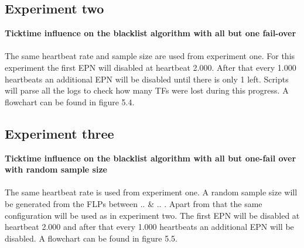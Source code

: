 
\subsection{Experiment two}
\textbf{Ticktime influence on the blacklist algorithm with all but one fail-over}
\\\\
The same heartbeat rate and sample size are used from experiment one. For this experiment the first EPN will disabled at heartbeat 2.000. After that every 1.000 heartbeats an additional EPN will be disabled until there is only 1 left. Scripts will parse all the logs to check how many TFs were lost during this progress. A flowchart can be found in figure 5.4.


\subsection{Experiment three}
\textbf{Ticktime influence on the blacklist algorithm with all but one-fail over with random sample size}
\\\\
The same heartbeat rate is used from experiment one. A random sample size will be generated from the FLPs between .. \& .. . Apart from that the same configuration will be used as in experiment two. The first EPN will be disabled at heartbeat 2.000 and after that every 1.000 heartbeats an additional EPN will be disabled. A flowchart can be found in figure 5.5.

